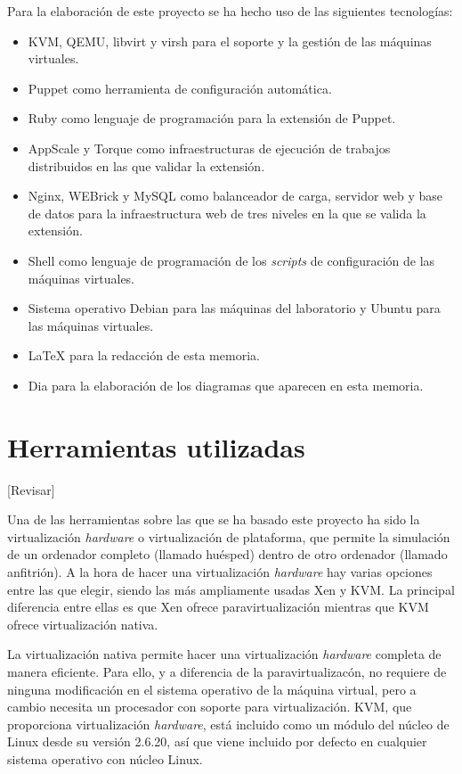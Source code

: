 Para la elaboración de este proyecto se ha hecho uso de las siguientes tecnologías:
\begin{itemize}
\item KVM, QEMU, libvirt y virsh para el soporte y la gestión de las máquinas virtuales.
\item Puppet como herramienta de configuración automática.
\item Ruby como lenguaje de programación para la extensión de Puppet.
\item AppScale y Torque como infraestructuras de ejecución de trabajos distribuidos en las que validar la extensión.
\item Nginx, WEBrick y MySQL como balanceador de carga, servidor web y base de datos para la infraestructura web de tres niveles en la que se valida la extensión.
\item Shell como lenguaje de programación de los \emph{scripts} de configuración de las máquinas virtuales.
\item Sistema operativo Debian para las máquinas del laboratorio y Ubuntu para las máquinas virtuales.
\item \LaTeX{} \cite{manual:latex} para la redacción de esta memoria.
\item Dia para la elaboración de los diagramas que aparecen en esta memoria.
\end{itemize}


\section{Herramientas utilizadas}

[Revisar]

Una de las herramientas sobre las que se ha basado este proyecto ha sido la virtualización \emph{hardware} o virtualización de plataforma, que permite la simulación de un ordenador completo (llamado huésped) dentro de otro ordenador (llamado anfitrión). A la hora de hacer una virtualización \emph{hardware} hay varias opciones entre las que elegir, siendo las más ampliamente usadas Xen y KVM. La principal diferencia entre ellas es que Xen ofrece paravirtualización mientras que KVM ofrece virtualización nativa.

La virtualización nativa permite hacer una virtualización \emph{hardware} completa de manera eficiente. Para ello, y a diferencia de la paravirtualizacón, no requiere de ninguna modificación en el sistema operativo de la máquina virtual, pero a cambio necesita un procesador con soporte para virtualización. KVM, que proporciona virtualización \emph{hardware}, está incluido como un módulo del núcleo de Linux desde su versión 2.6.20, así que viene incluido por defecto en cualquier sistema operativo con núcleo Linux.

